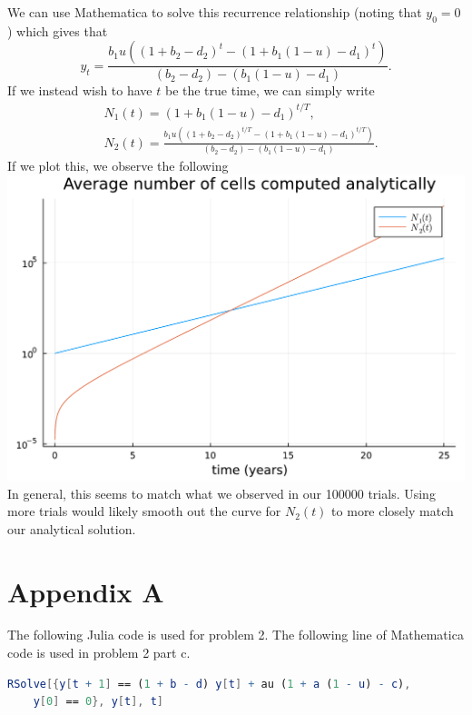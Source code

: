 \documentclass{article}
\begin{document}
We can use Mathematica to solve this recurrence relationship (noting that $y_0=0$) which gives that
\[
y_t=\frac{b_1u((1+b_2-d_2)^t-(1+b_1(1-u)-d_1)^t)}{(b_2-d_2)-(b_1(1-u)-d_1)}.
\]
If we instead wish to have $t$ be the true time, we can simply write
\begin{align*}
&N_1(t)=(1+b_1(1-u)-d_1)^{t/T},\\
&N_2(t)=\frac{b_1u((1+b_2-d_2)^{t/T}-(1+b_1(1-u)-d_1)^{t/T})}{(b_2-d_2)-(b_1(1-u)-d_1)}.
\end{align*}
If we plot this, we observe the following\\
\includegraphics[scale=0.5]{true_avg.pdf}\\
In general, this seems to match what we observed in our 100000 trials. Using more trials would likely smooth out the curve for $N_2(t)$ to more closely match our analytical solution. 

\section{Appendix A}
The following Julia code is used for problem 2.
The following line of Mathematica code is used in problem 2 part c.
\begin{lstlisting}[language=Mathematica]
RSolve[{y[t + 1] == (1 + b - d) y[t] + au (1 + a (1 - u) - c), 
	y[0] == 0}, y[t], t]	
\end{lstlisting}
\end{document}
